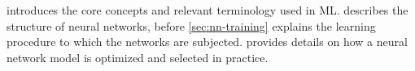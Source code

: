  introduces the core concepts and relevant terminology used in ML.
 describes the structure of neural networks, before \cref{sec:nn-training} explains the learning procedure to which the networks are subjected.  provides details on how a neural network model is optimized and selected in practice.








